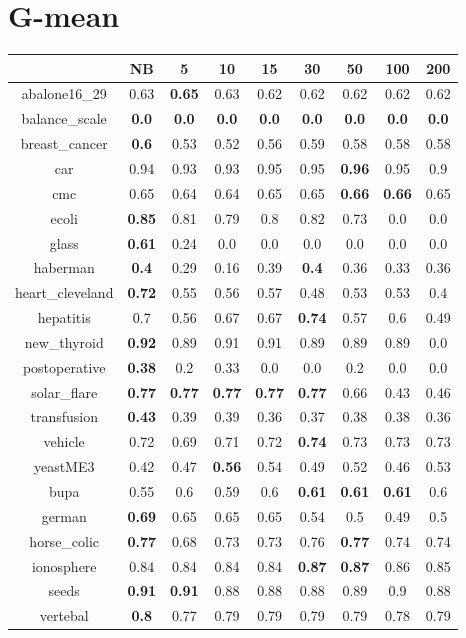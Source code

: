 \documentclass{article}%
\begin{document}
%
\section*{G{-}mean}%
\begin{tabular}{c|cccccccc}%
\hline%
&NB&5&10&15&30&50&100&200\\%
\hline%
abalone16\_29&0.63&\textbf{0.65}&0.63&0.62&0.62&0.62&0.62&0.62\\%
\hline%
balance\_scale&\textbf{0.0}&\textbf{0.0}&\textbf{0.0}&\textbf{0.0}&\textbf{0.0}&\textbf{0.0}&\textbf{0.0}&\textbf{0.0}\\%
\hline%
breast\_cancer&\textbf{0.6}&0.53&0.52&0.56&0.59&0.58&0.58&0.58\\%
\hline%
car&0.94&0.93&0.93&0.95&0.95&\textbf{0.96}&0.95&0.9\\%
\hline%
cmc&0.65&0.64&0.64&0.65&0.65&\textbf{0.66}&\textbf{0.66}&0.65\\%
\hline%
ecoli&\textbf{0.85}&0.81&0.79&0.8&0.82&0.73&0.0&0.0\\%
\hline%
glass&\textbf{0.61}&0.24&0.0&0.0&0.0&0.0&0.0&0.0\\%
\hline%
haberman&\textbf{0.4}&0.29&0.16&0.39&\textbf{0.4}&0.36&0.33&0.36\\%
\hline%
heart\_cleveland&\textbf{0.72}&0.55&0.56&0.57&0.48&0.53&0.53&0.4\\%
\hline%
hepatitis&0.7&0.56&0.67&0.67&\textbf{0.74}&0.57&0.6&0.49\\%
\hline%
new\_thyroid&\textbf{0.92}&0.89&0.91&0.91&0.89&0.89&0.89&0.0\\%
\hline%
postoperative&\textbf{0.38}&0.2&0.33&0.0&0.0&0.2&0.0&0.0\\%
\hline%
solar\_flare&\textbf{0.77}&\textbf{0.77}&\textbf{0.77}&\textbf{0.77}&\textbf{0.77}&0.66&0.43&0.46\\%
\hline%
transfusion&\textbf{0.43}&0.39&0.39&0.36&0.37&0.38&0.38&0.36\\%
\hline%
vehicle&0.72&0.69&0.71&0.72&\textbf{0.74}&0.73&0.73&0.73\\%
\hline%
yeastME3&0.42&0.47&\textbf{0.56}&0.54&0.49&0.52&0.46&0.53\\%
\hline%
bupa&0.55&0.6&0.59&0.6&\textbf{0.61}&\textbf{0.61}&\textbf{0.61}&0.6\\%
\hline%
german&\textbf{0.69}&0.65&0.65&0.65&0.54&0.5&0.49&0.5\\%
\hline%
horse\_colic&\textbf{0.77}&0.68&0.73&0.73&0.76&\textbf{0.77}&0.74&0.74\\%
\hline%
ionosphere&0.84&0.84&0.84&0.84&\textbf{0.87}&\textbf{0.87}&0.86&0.85\\%
\hline%
seeds&\textbf{0.91}&\textbf{0.91}&0.88&0.88&0.88&0.89&0.9&0.88\\%
\hline%
vertebal&\textbf{0.8}&0.77&0.79&0.79&0.79&0.79&0.78&0.79\\%
\hline%
\end{tabular}

%
\end{document}
